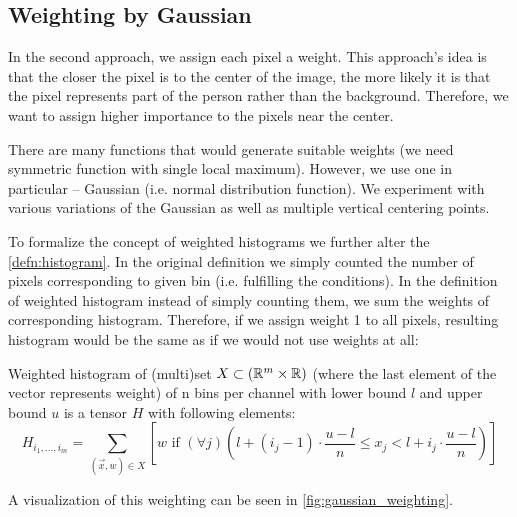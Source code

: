 \subsection{Weighting by Gaussian}

In the second approach, we assign each pixel a weight. This approach's idea is that the closer the pixel is to the center of the image, the more likely it is that the pixel represents part of the person rather than the background. Therefore, we want to assign higher importance to the pixels near the center.

There are many functions that would generate suitable weights (we need symmetric
function with single local maximum). However, we use one in particular
-- Gaussian (i.e. normal distribution function). We experiment with various
variations of the Gaussian as well as multiple vertical centering points.


To formalize the concept of weighted histograms we further alter the \autoref{defn:histogram}. In the original definition we simply counted the number of pixels corresponding to given bin (i.e. fulfilling the conditions). In the definition of weighted histogram instead of simply counting them, we sum the weights of corresponding histogram. Therefore, if we assign weight 1 to all pixels, resulting histogram would be the same as if we would not use weights at all:

\begin{defn}
\label{defn:weighted_histogram}
Weighted histogram of (multi)set $X \subset (\mathbb{R}^m \times \mathbb{R})$ (where the last
element of the vector represents weight) of n bins per channel with
lower bound $l$ and upper bound $u$ is a tensor $H$ with following elements:
$$H_{i_1, \ldots, i_m} = \sum_{(\vec{x}, w) \in X} \left[w \text{ if } (\forall j) \left(l + (i_j-1) \cdot \frac{u-l}{n} \leq x_j < l + i_j \cdot \frac{u-l}{n}\right)\right]$$
\end{defn}

A visualization of this weighting can be seen in \autoref{fig:gaussian_weighting}.

